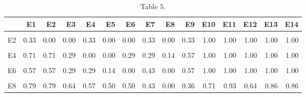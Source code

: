 \begin{table}[H]

\caption{Table 5.}
\centering
\fontsize{8}{10}\selectfont
\begin{tabular}[t]{lrrrrrrrrrrrrrr}
\toprule
  & E1 & E2 & E3 & E4 & E5 & E6 & E7 & E8 & E9 & E10 & E11 & E12 & E13 & E14\\
\midrule
\cellcolor{gray!6}{E1} & \cellcolor{gray!6}{0.00} & \cellcolor{gray!6}{0.33} & \cellcolor{gray!6}{0.00} & \cellcolor{gray!6}{0.33} & \cellcolor{gray!6}{0.00} & \cellcolor{gray!6}{0.00} & \cellcolor{gray!6}{0.33} & \cellcolor{gray!6}{0.00} & \cellcolor{gray!6}{0.67} & \cellcolor{gray!6}{1.00} & \cellcolor{gray!6}{1.00} & \cellcolor{gray!6}{1.00} & \cellcolor{gray!6}{1.00} & \cellcolor{gray!6}{1.00}\\
E2 & 0.33 & 0.00 & 0.00 & 0.33 & 0.00 & 0.00 & 0.33 & 0.00 & 0.33 & 1.00 & 1.00 & 1.00 & 1.00 & 1.00\\
\cellcolor{gray!6}{E3} & \cellcolor{gray!6}{0.50} & \cellcolor{gray!6}{0.50} & \cellcolor{gray!6}{0.00} & \cellcolor{gray!6}{0.17} & \cellcolor{gray!6}{0.00} & \cellcolor{gray!6}{0.17} & \cellcolor{gray!6}{0.33} & \cellcolor{gray!6}{0.17} & \cellcolor{gray!6}{0.67} & \cellcolor{gray!6}{1.00} & \cellcolor{gray!6}{1.00} & \cellcolor{gray!6}{1.00} & \cellcolor{gray!6}{1.00} & \cellcolor{gray!6}{1.00}\\
E4 & 0.71 & 0.71 & 0.29 & 0.00 & 0.00 & 0.29 & 0.29 & 0.14 & 0.57 & 1.00 & 1.00 & 1.00 & 1.00 & 1.00\\
\cellcolor{gray!6}{E5} & \cellcolor{gray!6}{0.62} & \cellcolor{gray!6}{0.62} & \cellcolor{gray!6}{0.25} & \cellcolor{gray!6}{0.12} & \cellcolor{gray!6}{0.00} & \cellcolor{gray!6}{0.25} & \cellcolor{gray!6}{0.25} & \cellcolor{gray!6}{0.12} & \cellcolor{gray!6}{0.62} & \cellcolor{gray!6}{1.00} & \cellcolor{gray!6}{1.00} & \cellcolor{gray!6}{1.00} & \cellcolor{gray!6}{1.00} & \cellcolor{gray!6}{1.00}\\
\addlinespace
E6 & 0.57 & 0.57 & 0.29 & 0.29 & 0.14 & 0.00 & 0.43 & 0.00 & 0.57 & 1.00 & 1.00 & 1.00 & 1.00 & 1.00\\
\cellcolor{gray!6}{E7} & \cellcolor{gray!6}{0.80} & \cellcolor{gray!6}{0.80} & \cellcolor{gray!6}{0.60} & \cellcolor{gray!6}{0.50} & \cellcolor{gray!6}{0.40} & \cellcolor{gray!6}{0.60} & \cellcolor{gray!6}{0.00} & \cellcolor{gray!6}{0.20} & \cellcolor{gray!6}{0.50} & \cellcolor{gray!6}{0.70} & \cellcolor{gray!6}{0.80} & \cellcolor{gray!6}{0.60} & \cellcolor{gray!6}{0.80} & \cellcolor{gray!6}{0.80}\\
E8 & 0.79 & 0.79 & 0.64 & 0.57 & 0.50 & 0.50 & 0.43 & 0.00 & 0.36 & 0.71 & 0.93 & 0.64 & 0.86 & 0.86\\

\end{tabular}
\end{table}
